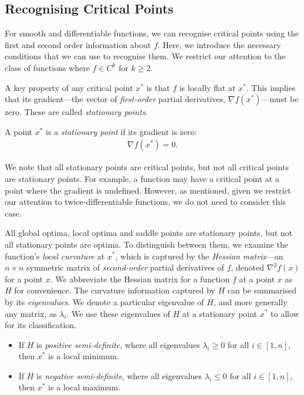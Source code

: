 \subsection{Recognising Critical Points}
\label{ssec:recognising_critical_points}

For smooth and differentiable functions, we can recognise critical points using the first and second order information about $f$. Here, we introduce the necessary conditions that we can use to recognise them. We restrict our attention to the class of functions where $f \in C^k$ for $k \geq 2$.

A key property of any critical point $x^*$ is that $f$ is locally flat at $x^*$. This implies that its gradient---the vector of \textit{first-order} partial derivatives, $\nabla f(x^*)$---must be zero. These are called \textit{stationary points}.
\begin{definition}
    A point $x^*$ is a \textit{stationary point} if its gradient is zero:
    \begin{align}
        \nabla f(x^*) = 0.
    \end{align}
\end{definition}

We note that all stationary points are critical points, but not all critical points are stationary points. For example, a function may have a critical point at a point where the gradient is undefined. However, as mentioned, given we restrict our attention to twice-differentiable functions, we do not need to consider this case. 

All global optima, local optima and saddle points are stationary points, but not all stationary points are optima. To distinguish between them, we examine the function's \textit{local curvature} at $x^*$, which is captured by the \textit{Hessian matrix}---an $n \times n$ symmetric matrix of \textit{second-order} partial derivatives of $f$, denoted $\nabla^2 f(x)$ for a point $x$. We abbreviate the Hessian matrix for a function $f$ at a point $x$ as $H$ for convenience. The curvature information captured by $H$ can be summarised by its \textit{eigenvalues}. We denote a particular eigenvalue of $H$, and more generally any matrix, as $\lambda_i$. We use these eigenvalues of $H$ at a stationary point $x^*$ to allow for its classification.

\begin{itemize}
    \item If $H$ is \textit{positive semi-definite}, where all eigenvalues $\lambda_i \geq 0$ for all $i \in [1, n]$, then $x^*$ is a local minimum. 
    \item If $H$ is \textit{negative semi-definite}, where all eigenvalues $\lambda_i \leq 0$ for all $i \in [1, n]$, then $x^*$ is a local maximum.
\end{itemize}

